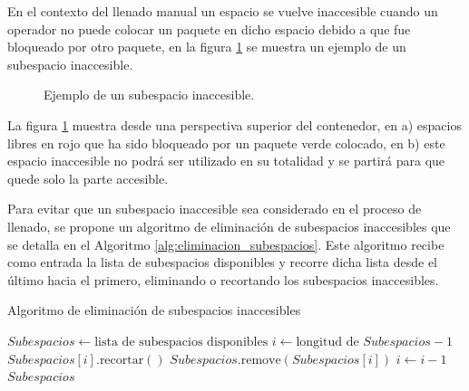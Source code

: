 \documentclass[openany]{article}
\begin{document}
En el contexto del llenado manual un espacio se vuelve inaccesible cuando un operador no puede colocar un paquete en dicho espacio debido a que fue bloqueado por otro paquete, en la figura \ref{fig:subespacio_inaccesible} se muestra un ejemplo de un subespacio inaccesible.

\begin{figure}[H]
    \centering
    
    \caption{Ejemplo de un subespacio inaccesible.}
    \label{fig:subespacio_inaccesible}
\end{figure}

La figura \ref{fig:subespacio_inaccesible} muestra desde una perspectiva superior del contenedor, en a) espacios libres en rojo que ha sido bloqueado por un paquete verde colocado, en b) este espacio inaccesible no podrá ser utilizado en su totalidad y se partirá para que quede solo la parte accesible.

Para evitar que un subespacio inaccesible sea considerado en el proceso de llenado, se propone un algoritmo de eliminación de subespacios inaccesibles que se detalla en el Algoritmo \ref{alg:eliminacion_subespacios}. Este algoritmo recibe como entrada la lista de subespacios disponibles y recorre dicha lista desde el último hacia el primero, eliminando o recortando los subespacios inaccesibles.

\begin{algorithm}[H]
    \caption{Algoritmo de eliminación de subespacios inaccesibles}
    \label{alg:eliminacion_subespacios}
    \begin{algorithmic}[1]
        \State $Subespacios \gets \text{lista de subespacios disponibles}$
        \State $i \gets \text{longitud de } Subespacios - 1$
        \State $Subespacios[i].\text{recortar}()$
        \State $Subespacios.\text{remove}(Subespacios[i])$
        \EndIf
        \State $i \gets i - 1$
        \EndWhile
        \State \Return $Subespacios$
    \end{algorithmic}
\end{algorithm}
\end{document}
